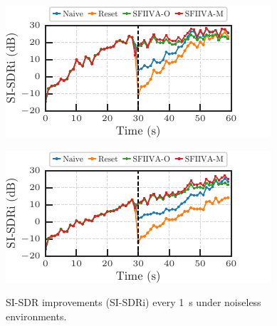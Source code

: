 \documentclass[sip,biber]{now-journal}
\begin{document}
\begin{figure}[t]
  \begin{minipage}[t]{.45\textwidth}
    \centering\includegraphics{figures/plots/clean/line_980.pdf}\label{fig:plot:line:980}
  \end{minipage}
  \hspace{.05\textwidth}
  \begin{minipage}[t]{.45\textwidth}
    \centering\includegraphics{figures/plots/clean/line_990.pdf}\label{fig:plot:line:990}
  \end{minipage}
  \caption{SI-SDR improvements (SI-SDRi) every \SI{1}{\second} under noiseless environments.}%
  \label{fig:plot:line}
\end{figure}
\end{document}
